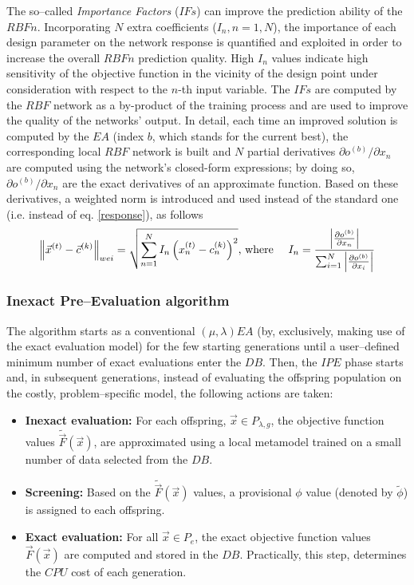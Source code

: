 The so--called \textit{Importance Factors} ($IFs$) \cite{LTT_2_018} can improve the prediction ability of the $RBFn$. Incorporating $N$ extra coefficients ($I_n, n\!=\!1,N$), the importance of each design parameter on the network response is quantified and exploited in order to increase the overall $RBFn$ prediction quality. High $I_n$ values indicate high sensitivity of the objective function in the vicinity of the design point under consideration with respect to the $n$-th input variable. The $IFs$ are computed by the $RBF$ network as a by-product of the training process and are used to improve the quality of the networks' output. 
In detail, each time an improved solution is computed by the $EA$ (index $b$, which stands for the current best), the corresponding local $RBF$ network is built and $N$ partial derivatives $\partial o^{(b)} / \partial x_{n}$ are computed using the network's closed-form expressions; by doing so, $\partial o^{(b)} / \partial x_{n}$ are the exact derivatives of an approximate function. 
Based on these derivatives, a weighted norm is introduced and used instead of the standard one (i.e. instead of eq. \ref{response}), as follows
%
\begin{equation}\label{e:IFcomp}
    \left\|\vec x^{(t)}-\vec c^{(k)}\right\|_{wei} =
    \sqrt{  \sum_{n=1}^N I_n\left(x_n^{(t)}-c_n^{(k)}\right)^2  }
	\mbox{,~where~~~~}
    I_n = { {\left|  {\partial o^{(b)}} \over {\partial x_n} \right|} 
          \over 
  { \sum_{i=1}^{N} \left| {\partial o^{(b)}} \over {\partial x_i} \right| } }
\end{equation}


\subsubsection{Inexact Pre--Evaluation algorithm}


The algorithm starts as a conventional $(\mu, \lambda)EA$ (by, exclusively, making use of the exact evaluation model) for the few starting generations until a user--defined minimum number of exact evaluations enter the $DB$. 
Then, the $IPE$ phase starts and, in subsequent generations, instead of evaluating the offspring population on the costly, problem--specific model, the following actions are taken:
\newcommand{\apprx}[1]{\tilde{#1}}
\begin{itemize}
\item[]{\bf Inexact evaluation:}
For each offspring, $\vec{x}\!\in\!P_{\lambda,g}$, the objective function values $\apprx{\vec{F}}(\vec{x})$, are approximated using a local metamodel trained on a small number of data selected from the $DB$. 
%
\item[]{\bf Screening:}
Based on the $\apprx{\vec{F}}(\vec{x})$ values, a provisional
$\phi$ value (denoted by $\apprx{\phi}$) is assigned to each
offspring.
\item[]{\bf Exact evaluation:}
For all $\vec{x}\!\in\!P_{e}$, the exact objective function values $\vec{F}(\vec{x})$ are computed and stored in the $DB$. 
Practically, this step, determines the $CPU$ cost of each generation.
\end{itemize}


